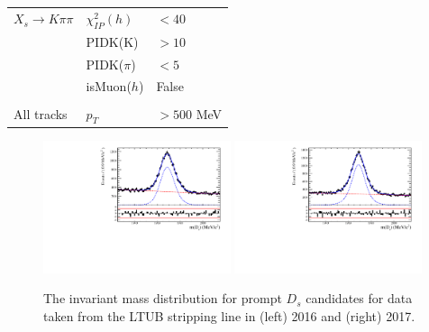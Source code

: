 \begin{table}[h]
\begin{tabular}{l l l}
\\
$X_s \to K \pi \pi$  &  $\chi^{2}_{IP}(h)$ &  $< 40$ \\
& PIDK(K) & $> 10$ \\
& PIDK($\pi$) & $< 5$ \\
& isMuon($h$) & False \\
\\
All tracks  & $p_T$ & $> 500$ MeV \\

\hline
\hline
\end{tabular}
\label{table:fakeBsel}
\end{table}

\begin{figure}[h]
\centering
\includegraphics[height=!,width=0.49\textwidth]{figs/Resolution/Ds_M_pull_16.pdf}
\includegraphics[height=!,width=0.49\textwidth]{figs/Resolution/Ds_M_pull_17.pdf}
\caption{The invariant mass distribution for prompt $D_s$ candidates for data taken from the LTUB stripping line in (left) 2016 and (right) 2017. }
\label{fig:ResoFit_Ds}
\end{figure}

